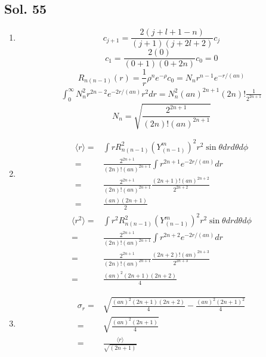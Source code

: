         \subsection*{Sol. 55}
        \begin{enumerate}
            \item 
            $$
            c_{j+1}
            =\frac{2(j+l+1-n)}{(j+1)(j+2l+2)}c_j
            $$
            $$
            c_1 = 
            \frac{2(0)}{(0+1)(0+2n)}c_0 = 0
            $$
            $$
            R_{n(n-1)}(r)
            =\frac{1}{r}\rho^{n}e^{-\rho}c_0
            =N_nr^{n-1}
            e^{-r/(an)}
            $$
            \begin{align*}
                \int_0^\infty 
                N_n^2 r^{2n-2}
                e^{-2r/(an)}r^2dr
                =N_n^2(an)^{2n+1}
                (2n)!\frac{1}{2^{2n+1}}
            \end{align*}
            $$
            N_n = \sqrt{\frac{2^{2n+1}}{(2n)!(an)^{2n+1}}}
            $$
            \item 
            \begin{align*}
                \langle r\rangle
                =& 
                \int rR_{n(n-1)}^2(Y_{(n-1)}^m)^2r^2\sin\theta dr d\theta d\phi\\
                =&
                \frac{2^{2n+1}}{(2n)!(an)^{2n+1}}
                \int r^{2n+1}e^{-2r/(an)}dr\\
                =& 
                \frac{2^{2n+1}}{(2n)!(an)^{2n+1}}
                \frac{(2n+1)!(an)^{2n+2}}{2^{2n+2}}\\
                =&\frac{(an)(2n+1)}{2}
            \end{align*}
            \begin{align*}
                \langle r^2\rangle
                =& 
                \int r^2R_{n(n-1)}^2(Y_{(n-1)}^m)^2r^2\sin\theta dr d\theta d\phi\\
                =&
                \frac{2^{2n+1}}{(2n)!(an)^{2n+1}}
                \int r^{2n+2}e^{-2r/(an)}dr\\
                =& 
                \frac{2^{2n+1}}{(2n)!(an)^{2n+1}}
                \frac{(2n+2)!(an)^{2n+3}}{2^{2n+3}}\\
                =&\frac{(an)^2(2n+1)(2n+2)}{4}
            \end{align*}
            \item 
            \begin{align*}
                \sigma_r = &
            \sqrt{\frac{(an)^2(2n+1)(2n+2)}{4}
            -\frac{(an)^2(2n+1)^2}{4}}\\
            =&\sqrt{\frac{(an)^2(2n+1)}{4}}\\
            =&\frac{\langle r\rangle}{\sqrt{(2n+1)}}
            \end{align*}
        \end{enumerate}

